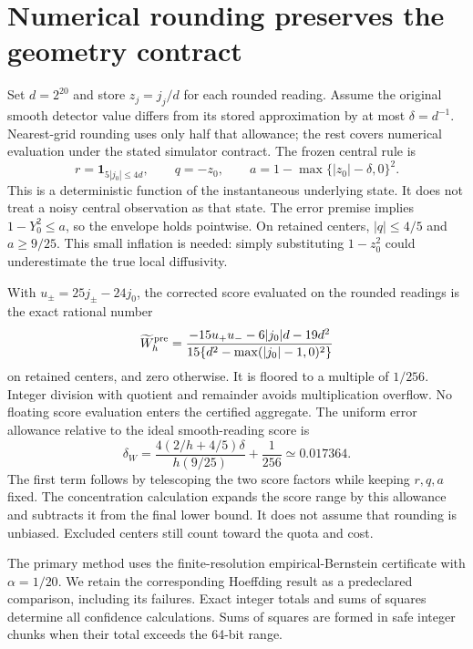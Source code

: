 \section{Numerical rounding preserves the geometry contract}
Set $d=2^{20}$ and store $z_j=j_j/d$ for each rounded reading. Assume the original
smooth detector value differs from its stored approximation by at most
$\delta=d^{-1}$. Nearest-grid rounding uses only half that allowance; the rest
covers numerical evaluation under the stated simulator contract. The frozen
central rule is
\begin{equation}
 r=\mathbf 1_{5|j_0|\le4d},\qquad q=-z_0,\qquad
 a=1-\max\{|z_0|-\delta,0\}^2.
 \label{eq:og-experiment-rule}
\end{equation}
This is a deterministic function of the instantaneous underlying state.
It does not treat a noisy central observation as that state. The error premise
implies $1-Y_0^2\le a$, so the envelope holds pointwise. On retained centers,
$|q|\le4/5$ and $a\ge9/25$. This small inflation is needed: simply substituting
$1-z_0^2$ could underestimate the true local diffusivity.

With $u_\pm=25j_\pm-24j_0$, the corrected score evaluated on the rounded readings
is the exact rational number
\begin{equation}
 \widetilde W^{\rm pre}_h=
 \frac{-15u_+u_- -6|j_0|d-19d^2}
 {15\{d^2-\max(|j_0|-1,0)^2\}}
 \label{eq:og-integer-score}
\end{equation}
on retained centers, and zero otherwise. It is floored to a multiple of
$1/256$. Integer division with quotient and remainder avoids multiplication
overflow. No floating score evaluation enters the certified aggregate.
The uniform error allowance relative to the ideal smooth-reading score is
\begin{equation}
 \delta_W=\frac{4(2/h+4/5)\delta}{h(9/25)}+\frac1{256}
 \simeq0.017364.
\end{equation}
The first term follows by telescoping the two score factors while keeping
$r,q,a$ fixed. The concentration calculation expands the score range by this
allowance and subtracts it from the final lower bound. It does not assume that
rounding is unbiased. Excluded centers still count toward the quota and cost.

The primary method uses the finite-resolution empirical-Bernstein certificate
with $\alpha=1/20$. We retain the corresponding Hoeffding result as a
predeclared comparison, including its failures. Exact integer totals and sums
of squares determine all confidence calculations. Sums of squares are formed
in safe integer chunks when their total exceeds the 64-bit range.

